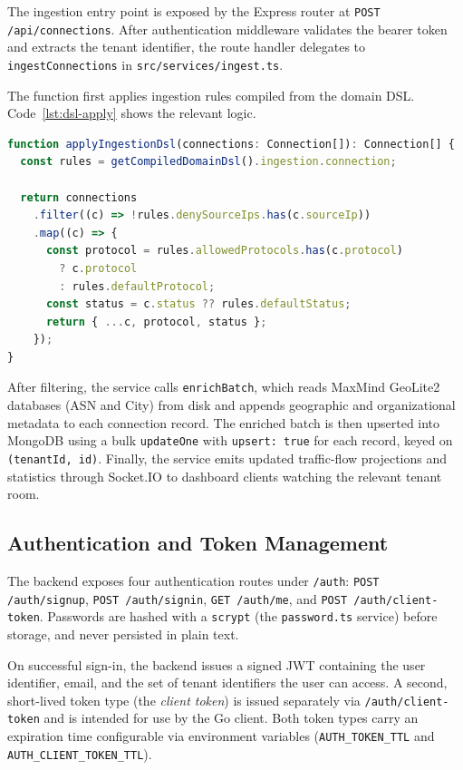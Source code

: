 \documentclass[12pt]{report}
\begin{document}
The ingestion entry point is exposed by the Express router at
\texttt{POST /api/connections}. After authentication middleware validates the
bearer token and extracts the tenant identifier, the route handler delegates
to \texttt{ingestConnections} in \texttt{src/services/ingest.ts}.

The function first applies ingestion rules compiled from the domain DSL.
Code~\ref{lst:dsl-apply} shows the relevant logic.

\begin{lstlisting}[language=TypeScript, caption={Domain DSL application during ingestion.}, label={lst:dsl-apply}]
function applyIngestionDsl(connections: Connection[]): Connection[] {
  const rules = getCompiledDomainDsl().ingestion.connection;

  return connections
    .filter((c) => !rules.denySourceIps.has(c.sourceIp))
    .map((c) => {
      const protocol = rules.allowedProtocols.has(c.protocol)
        ? c.protocol
        : rules.defaultProtocol;
      const status = c.status ?? rules.defaultStatus;
      return { ...c, protocol, status };
    });
}
\end{lstlisting}

After filtering, the service calls \texttt{enrichBatch}, which reads
MaxMind GeoLite2 databases (ASN and City) from disk and appends geographic
and organizational metadata to each connection record. The enriched batch is
then upserted into MongoDB using a bulk \texttt{updateOne} with
\texttt{upsert: true} for each record, keyed on \texttt{(tenantId, id)}.
Finally, the service emits updated traffic-flow projections and statistics
through Socket.IO to dashboard clients watching the relevant tenant room.

\subsection{Authentication and Token Management}

The backend exposes four authentication routes under \texttt{/auth}:
\texttt{POST /auth/signup}, \texttt{POST /auth/signin}, \texttt{GET /auth/me},
and \texttt{POST /auth/client-token}. Passwords are hashed with a
\texttt{scrypt} (the \texttt{password.ts} service) before
storage, and never persisted in plain text.

On successful sign-in, the backend issues a signed JWT containing the user
identifier, email, and the set of tenant identifiers the user can access. A
second, short-lived token type (the
\textit{client token}) is issued separately via \texttt{/auth/client-token} and
is intended for use by the Go client. Both token types carry an expiration time
configurable via environment variables (\texttt{AUTH\_TOKEN\_TTL} and
\texttt{AUTH\_CLIENT\_TOKEN\_TTL}).
\end{document}
